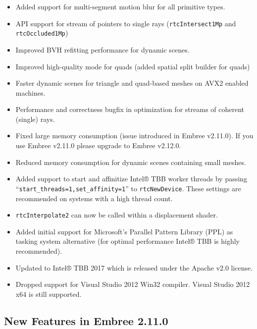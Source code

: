 \begin{itemize}
\tightlist
\item
  Added support for multi-segment motion blur for all primitive types.
\item
  API support for stream of pointers to single rays
  (\texttt{rtcIntersect1Mp} and \texttt{rtcOccluded1Mp})
\item
  Improved BVH refitting performance for dynamic scenes.
\item
  Improved high-quality mode for quads (added spatial split builder for
  quads)
\item
  Faster dynamic scenes for triangle and quad-based meshes on AVX2
  enabled machines.
\item
  Performance and correctness bugfix in optimization for streams of
  coherent (single) rays.
\item
  Fixed large memory consumption (issue introduced in Embree v2.11.0).
  If you use Embree v2.11.0 please upgrade to Embree v2.12.0.
\item
  Reduced memory consumption for dynamic scenes containing small meshes.
\item
  Added support to start and affinitize Intel® TBB worker threads by
  passing ``\texttt{start\_threads=1,set\_affinity=1}'' to
  \texttt{rtcNewDevice}. These settings are recommended on systems with
  a high thread count.
\item
  \texttt{rtcInterpolate2} can now be called within a displacement
  shader.
\item
  Added initial support for Microsoft's Parallel Pattern Library (PPL)
  as tasking system alternative (for optimal performance Intel® TBB is
  highly recommended).
\item
  Updated to Intel® TBB 2017 which is released under the Apache v2.0
  license.
\item
  Dropped support for Visual Studio 2012 Win32 compiler. Visual Studio
  2012 x64 is still supported.
\end{itemize}

\subsection{New Features in Embree
2.11.0}\label{new-features-in-embree-2.11.0}

